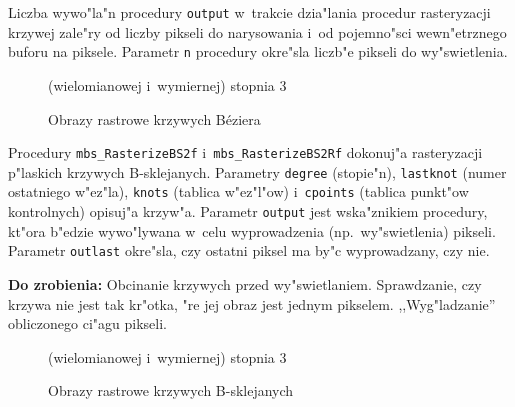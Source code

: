 Liczba wywo"la"n procedury \texttt{output} w~trakcie dzia"lania procedur
rasteryzacji krzywej zale"ry od liczby pikseli do narysowania i~od
pojemno"sci wewn"etrznego buforu na piksele. Parametr \texttt{n} procedury
okre"sla liczb"e pikseli do wy"swietlenia.

\begin{figure}[ht]
  \centerline{}
  \caption{Obrazy rastrowe krzywych B\'{e}ziera}
  \centerline{(wielomianowej i~wymiernej) stopnia $3$}
\end{figure}

\vspace{\bigskipamount}
Procedury \texttt{mbs\_RasterizeBS2f} i~\texttt{mbs\_RasterizeBS2Rf}
dokonuj"a rasteryzacji p"laskich krzywych B-sklejanych. Parametry
\texttt{degree} (stopie"n), \texttt{lastknot} (numer ostatniego w"ez"la),
\texttt{knots} (tablica w"ez"l"ow) i~\texttt{cpoints} (tablica punkt"ow
kontrolnych) opisuj"a krzyw"a. Parametr \texttt{output} jest wska"znikiem
procedury, kt"ora b"edzie wywo"lywana w~celu wyprowadzenia (np.\
wy"swietlenia) pikseli. Parametr \texttt{outlast} okre"sla, czy ostatni
piksel ma by"c wyprowadzany, czy nie.

\vspace{\medskipamount}
\noindent
\textbf{Do zrobienia:} Obcinanie krzywych przed wy"swietlaniem. Sprawdzanie,
czy krzy\-wa nie jest tak kr"otka, "re jej obraz jest jednym pikselem.
,,Wyg"ladzanie'' obliczonego ci"agu pikseli.


\begin{figure}[ht]
  \centerline{}
  \caption{Obrazy rastrowe krzywych B-sklejanych}
  \centerline{(wielomianowej i~wymiernej) stopnia $3$}
\end{figure}

\clearpage

